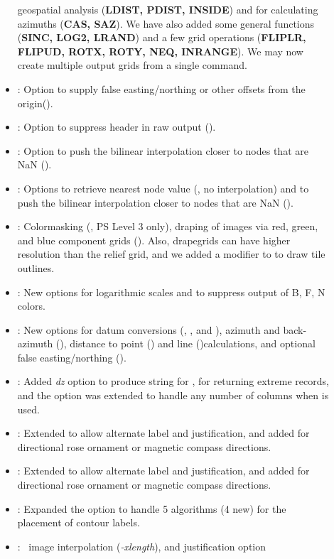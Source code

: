 \begin{description}
\begin{itemize}
geospatial analysis (\textbf{LDIST,  PDIST, INSIDE}) and for calculating azimuths (\textbf{CAS, SAZ}).  We have
also added some general functions (\textbf{SINC, LOG2, LRAND}) and a few grid operations (\textbf{FLIPLR, FLIPUD, ROTX, ROTY, NEQ,
INRANGE}).  We may now create multiple output grids from a single command.
\item {}: Option to supply false easting/northing or other offsets from the origin().
\item {}: Option to suppress header in raw output ().
\item {}:	Option to push the bilinear interpolation closer to nodes that are NaN ().
\item {}:	Options to retrieve nearest node value (, no interpolation) and to push
the bilinear interpolation closer to nodes that are NaN ().
\item {}:	Colormasking (, PS Level 3 only), draping of images via red, green,
and blue component grids ().  Also,  drapegrids can have higher resolution than the relief grid, and we
added a modifier to  to draw tile outlines.
\item {}:	New options  for logarithmic scales and  to suppress output
of B, F, N colors.
\item {}:	New options for datum conversions (, , and ), azimuth and
back-azimuth (), distance to point () and line  ()calculations, and optional false easting/northing ().
\item {}:		Added \emph{dz} option to produce  string for ,
 for returning extreme records, and the  option was extended to handle any number of columns when  is used.
\item {}:	Extended  to allow alternate label and justification, and added 
for directional rose ornament or magnetic compass directions.
\item {}:	Extended  to allow alternate label and justification, and added 
for directional rose ornament or magnetic compass directions.
\item {}:	Expanded the  option to handle 5 algorithms (4 new) for the placement
of contour labels. 
\item {}:	\PS\ image interpolation (\emph{-xlength}), and justification option

\end{itemize}
\end{description}
